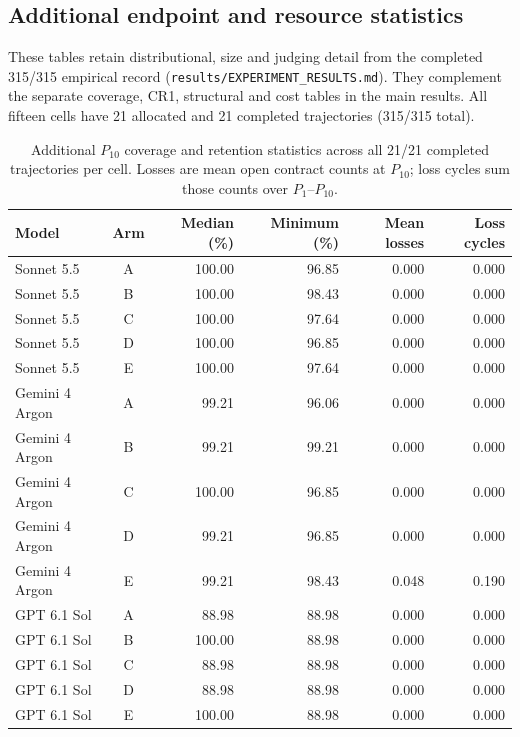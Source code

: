 \FloatBarrier
\subsection{Additional endpoint and resource statistics}\label{app:resultsdetail}

These tables retain distributional, size and judging detail from the
completed 315/315 empirical record (\nolinkurl{results/EXPERIMENT_RESULTS.md}).
They complement the separate coverage, CR1, structural and cost tables in
the main results. All fifteen cells have 21 allocated and 21 completed
trajectories (315/315 total).

\begin{table}[!htbp]
\centering\small
\caption{Additional $P_{10}$ coverage and retention statistics across all
21/21 completed trajectories per cell. Losses are mean open contract counts
at $P_{10}$; loss cycles sum those counts over $P_1$--$P_{10}$.}\label{tab:resultsdistribution}
\begin{tabular*}{\textwidth}{@{\extracolsep{\fill}}lcrrrr@{}}
\toprule
Model & Arm & Median (\%) & Minimum (\%) & Mean losses & Loss cycles \\
\midrule
Sonnet 5.5 & A & 100.00 & 96.85 & 0.000 & 0.000 \\
Sonnet 5.5 & B & 100.00 & 98.43 & 0.000 & 0.000 \\
Sonnet 5.5 & C & 100.00 & 97.64 & 0.000 & 0.000 \\
Sonnet 5.5 & D & 100.00 & 96.85 & 0.000 & 0.000 \\
Sonnet 5.5 & E & 100.00 & 97.64 & 0.000 & 0.000 \\
\midrule
Gemini 4 Argon & A & 99.21 & 96.06 & 0.000 & 0.000 \\
Gemini 4 Argon & B & 99.21 & 99.21 & 0.000 & 0.000 \\
Gemini 4 Argon & C & 100.00 & 96.85 & 0.000 & 0.000 \\
Gemini 4 Argon & D & 99.21 & 96.85 & 0.000 & 0.000 \\
Gemini 4 Argon & E & 99.21 & 98.43 & 0.048 & 0.190 \\
\midrule
GPT 6.1 Sol & A & 88.98 & 88.98 & 0.000 & 0.000 \\
GPT 6.1 Sol & B & 100.00 & 88.98 & 0.000 & 0.000 \\
GPT 6.1 Sol & C & 88.98 & 88.98 & 0.000 & 0.000 \\
GPT 6.1 Sol & D & 88.98 & 88.98 & 0.000 & 0.000 \\
GPT 6.1 Sol & E & 100.00 & 88.98 & 0.000 & 0.000 \\
\bottomrule
\end{tabular*}
\end{table}

